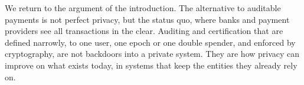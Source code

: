 We return to the argument of the introduction. The alternative to auditable
payments is not perfect privacy, but the status quo, where banks and payment
providers see all transactions in the clear. Auditing and certification that
are defined narrowly, to one user, one epoch or one double spender, and
enforced by cryptography, are not backdoors into a private system. They are how
privacy can improve on what exists today, in systems that keep the entities
they already rely on.
